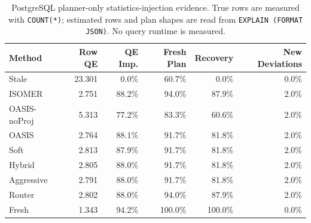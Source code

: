 \begin{table}[t]
  \centering
  \small
  \caption{PostgreSQL planner-only statistics-injection evidence. True rows are measured with \texttt{COUNT(*)}; estimated rows and plan shapes are read from \texttt{EXPLAIN (FORMAT JSON)}. No query runtime is measured.}
  \label{tab:postgres_planner_stats_injection}
  \setlength{\tabcolsep}{4pt}
  \begin{tabular}{lrrrrr}
    \toprule
    Method & Row QE & QE Imp. & Fresh Plan & Recovery & New Deviations \\
    \midrule
    Stale & 23.301 & 0.0\% & 60.7\% & 0.0\% & 0.0\% \\
    ISOMER & 2.751 & 88.2\% & 94.0\% & 87.9\% & 2.0\% \\
    OASIS-noProj & 5.313 & 77.2\% & 83.3\% & 60.6\% & 2.0\% \\
    OASIS & 2.764 & 88.1\% & 91.7\% & 81.8\% & 2.0\% \\
    Soft & 2.813 & 87.9\% & 91.7\% & 81.8\% & 2.0\% \\
    Hybrid & 2.805 & 88.0\% & 91.7\% & 81.8\% & 2.0\% \\
    Aggressive & 2.791 & 88.0\% & 91.7\% & 81.8\% & 2.0\% \\
    Router & 2.802 & 88.0\% & 94.0\% & 87.9\% & 2.0\% \\
    Fresh & 1.343 & 94.2\% & 100.0\% & 100.0\% & 0.0\% \\
    \bottomrule
  \end{tabular}
\end{table}
